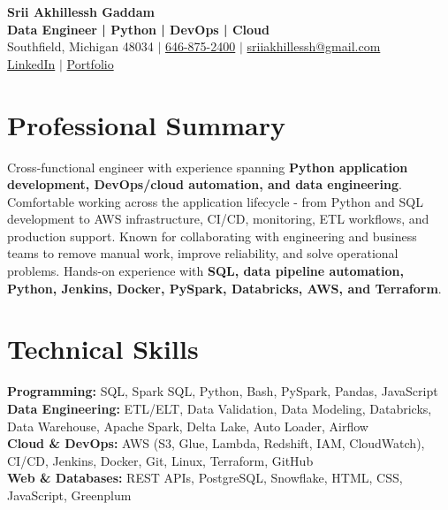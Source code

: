 \documentclass[letterpaper,10pt]{article}
\begin{document}
\fontsize{9.35pt}{10.45pt}\selectfont

\begin{center}
    {\LARGE \textbf{Srii Akhillessh Gaddam}} \\[-1pt]
    \textbf{Data Engineer | Python | DevOps | Cloud} \\[2pt]
    Southfield, Michigan 48034 $|$
    \href{tel:6468752400}{646-875-2400} $|$
    \href{mailto:sriiakhillessh@gmail.com}{sriiakhillessh@gmail.com} \\[1pt]
    \href{https://www.linkedin.com/in/srii-akhiilessh-gaddam-b48668191/}{LinkedIn} $|$
    \href{https://sriiakhillesshg.github.io/portfolio/}{Portfolio}
\end{center}
\vspace{-8pt}

\section{Professional Summary}
\small{Cross-functional engineer with experience spanning \textbf{Python application development, DevOps/cloud automation, and data engineering}. Comfortable working across the application lifecycle - from Python and SQL development to AWS infrastructure, CI/CD, monitoring, ETL workflows, and production support. Known for collaborating with engineering and business teams to remove manual work, improve reliability, and solve operational problems. Hands-on experience with \textbf{SQL, data pipeline automation, Python, Jenkins, Docker, PySpark, Databricks, AWS, and Terraform}.}

\section{Technical Skills}
\small{
\textbf{Programming:} SQL, Spark SQL, Python, Bash, PySpark, Pandas, JavaScript \\
\textbf{Data Engineering:} ETL/ELT, Data Validation, Data Modeling, Databricks, Data Warehouse, Apache Spark, Delta Lake, Auto Loader, Airflow \\
\textbf{Cloud \& DevOps:} AWS (S3, Glue, Lambda, Redshift, IAM, CloudWatch), CI/CD, Jenkins, Docker, Git, Linux, Terraform, GitHub \\
\textbf{Web \& Databases:} REST APIs, PostgreSQL, Snowflake, HTML, CSS, JavaScript, Greenplum
}
\end{document}

